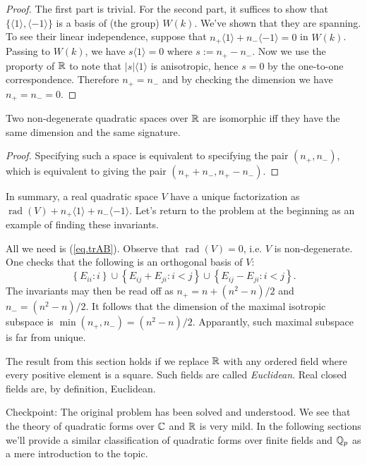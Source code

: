 \documentclass{article}
\newcommand{\rad}{\operatorname{rad}}
\newcommand{\GW}{\widehat{W}}
\begin{document}
\begin{proof}
    The first part is trivial. For the second part, it suffices to show that $\{\langle1\rangle,\langle-1\rangle\}$ is a basis of (the group) $\GW(k)$. We've shown that they are spanning. To see their linear independence, suppose that $n_+\langle1\rangle+n_-\langle-1\rangle=0$ in $\GW(k)$. Passing to $W(k)$, we have $s\langle 1\rangle=0$ where $s:=n_+-n_-$. Now we use the proporty of $\mathbb{R}$ to note that $\vert s\vert\langle1\rangle$ is anisotropic, hence $s=0$ by the one-to-one correspondence. Therefore $n_+=n_-$ and by checking the dimension we have $n_+=n_-=0$.
\end{proof}

\begin{corollary}
    Two non-degenerate quadratic spaces over $\mathbb{R}$ are isomorphic iff they have the same dimension and the same signature.
\end{corollary}

\begin{proof}
    Specifying such a space is equivalent to specifying the pair $(n_+,n_-)$, which is equivalent to giving the pair $(n_++n_-,n_+-n_-)$.
\end{proof}

In summary, a real quadratic space $V$ have a unique factorization as $\rad(V)+n_+\langle1\rangle+n_-\langle-1\rangle$. Let's return to the problem at the beginning as an example of finding these invariants.

All we need is (\ref{eq.trAB}). Observe that $\rad(V)=0$, i.e. $V$ is non-degenerate. One checks that the following is an orthogonal basis of $V$:
\begin{equation*}
    \left\{E_{ii}: i\right\} \cup
    \left\{E_{ij}+E_{ji}: i<j\right\} \cup
    \left\{E_{ij}-E_{ji}: i<j\right\}.
\end{equation*}
The invariants may then be read off as $n_+=n+(n^2-n)/2$ and $n_-=(n^2-n)/2$. It follows that the dimension of the maximal isotropic subspace is $\min(n_+,n_-)=(n^2-n)/2$. Apparantly, such maximal subspace is far from unique.

\begin{remark}
    The result from this section holds if we replace $\mathbb{R}$ with any ordered field where every positive element is a square. Such fields are called \emph{Euclidean}. Real closed fields are, by definition, Euclidean.
\end{remark}

Checkpoint: The original problem has been solved and understood. We see that the theory of quadratic forms over $\mathbb{C}$ and $\mathbb{R}$ is very mild. In the following sections we'll provide a similar classification of quadratic forms over finite fields and $\mathbb{Q}_p$ as a mere introduction to the topic.
\end{document}
